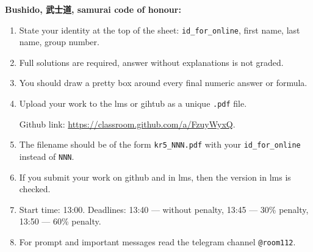 \documentclass[12pt]{article}
\begin{document}
\vspace{15mm}


\textbf{Bushido, 武士道, samurai code of honour:}

\vspace{5mm}

\begin{enumerate}
\item State your identity at the top of the sheet: \verb|id_for_online|, first name, last name, group number.
\item Full solutions are required, answer without explanations is not graded. 
\item You should draw a pretty box around every final numeric answer or formula.
\item Upload your work to the lms or gihtub as a unique \verb|.pdf| file.

Github link: \url{https://classroom.github.com/a/FzuyWyxQ}.
\item The filename should be of the form \verb|kr5_NNN.pdf| with your \verb|id_for_online| instead of \verb|NNN|.
\item If you submit your work on github and in lms, then the version in lms is checked.
\item Start time: 13:00. Deadlines: 13:40 — without penalty, 13:45 — 30\% penalty, 13:50 — 60\% penalty.
\item For prompt and important messages read the telegram channel \verb|@room112|.
\end{enumerate}
\end{document}
